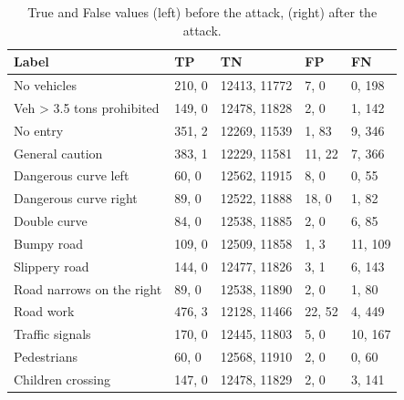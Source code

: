 \begin{table}[ht!]
\centering
  \begin{tabular}{| l | p{1.5cm} | p{2cm} | p{1.5cm} | p{1.5cm} |}
  \hline
  \rowcolor{lightgray} Label & TP & TN & FP & FN \\ [0.5ex]
  \hline
  No vehicles & 210, 0 & 12413, 11772 & 7, 0 & 0, 198\\
  \hline
  Veh > 3.5 tons prohibited & 149, 0 & 12478, 11828 & 2, 0 & 1, 142\\
  \hline
  No entry & 351, 2 & 12269, 11539 & 1, 83 & 9, 346\\
  \hline
  General caution & 383, 1 & 12229, 11581 & 11, 22 & 7, 366\\
  \hline
  Dangerous curve left & 60, 0 & 12562, 11915 & 8, 0 & 0, 55\\
  \hline
  Dangerous curve right & 89, 0 & 12522, 11888 & 18, 0 & 1, 82\\
  \hline
  Double curve & 84, 0 & 12538, 11885 & 2, 0 & 6, 85\\
  \hline
  Bumpy road & 109, 0 & 12509, 11858 & 1, 3 & 11, 109\\
  \hline
  Slippery road & 144, 0 & 12477, 11826 & 3, 1 & 6, 143\\
  \hline
  Road narrows on the right & 89, 0 & 12538, 11890 & 2, 0 & 1, 80\\
  \hline
  Road work & 476, 3 & 12128, 11466 & 22, 52 & 4, 449\\
  \hline
  Traffic signals & 170, 0 & 12445, 11803 & 5, 0 & 10, 167\\
  \hline
  Pedestrians & 60, 0 & 12568, 11910 & 2, 0 & 0, 60\\
  \hline
  Children crossing & 147, 0 & 12478, 11829 & 2, 0 & 3, 141\\
  \hline
  \end{tabular}
  \caption{True and False values (left) before the attack, (right) after the attack.}
  \label{tab:pos_neg_2}
\end{table}

